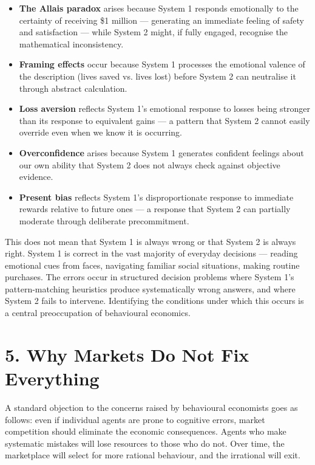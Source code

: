 \documentclass[12pt, letterpaper]{article}
\begin{document}
\begin{itemize}
\item \textbf{The Allais paradox} arises because System 1 responds emotionally to the certainty of receiving \$1 million --- generating an immediate feeling of safety and satisfaction --- while System 2 might, if fully engaged, recognise the mathematical inconsistency.
\item \textbf{Framing effects} occur because System 1 processes the emotional valence of the description (lives saved vs. lives lost) before System 2 can neutralise it through abstract calculation.
\item \textbf{Loss aversion} reflects System 1's emotional response to losses being stronger than its response to equivalent gains --- a pattern that System 2 cannot easily override even when we know it is occurring.
\item \textbf{Overconfidence} arises because System 1 generates confident feelings about our own ability that System 2 does not always check against objective evidence.
\item \textbf{Present bias} reflects System 1's disproportionate response to immediate rewards relative to future ones --- a response that System 2 can partially moderate through deliberate precommitment.
\end{itemize}

This does not mean that System 1 is always wrong or that System 2 is always right. System 1 is correct in the vast majority of everyday decisions --- reading emotional cues from faces, navigating familiar social situations, making routine purchases. The errors occur in structured decision problems where System 1's pattern-matching heuristics produce systematically wrong answers, and where System 2 fails to intervene. Identifying the conditions under which this occurs is a central preoccupation of behavioural economics.

\medskip


\section{5. Why Markets Do Not Fix Everything}


A standard objection to the concerns raised by behavioural economists goes as follows: even if individual agents are prone to cognitive errors, market competition should eliminate the economic consequences. Agents who make systematic mistakes will lose resources to those who do not. Over time, the marketplace will select for more rational behaviour, and the irrational will exit.
\end{document}
